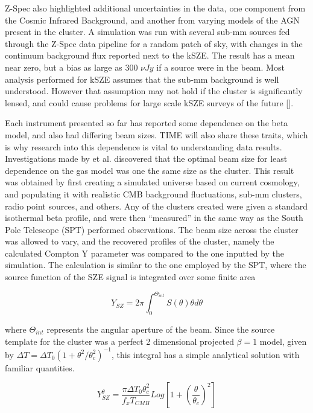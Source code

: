 \documentclass[manuscript]{aastex}
\begin{document}
Z-Spec also highlighted additional uncertainties in the data, one component from the Cosmic Infrared Background, and another from varying models of the AGN present in the cluster. A simulation was run with several sub-mm sources fed through the Z-Spec data pipeline for a random patch of sky, with changes in the continuum background flux reported next to the kSZE. The result has a mean near zero, but a bias as large as 300 $\nu Jy$ if a source were in the beam. Most analysis performed for kSZE assumes that the sub-mm background is well understood. However that assumption may not hold if the cluster is significantly lensed, and could cause problems for large scale kSZE surveys of the future [\cite{Zemcov2012}].

Each instrument presented so far has reported some dependence on the beta model, and also had differing beam sizes. TIME will also share these traits, which is why research into this dependence is vital to understanding data results. Investigations made by \cite{Saliwanchick2015} et al. discovered that the optimal beam size for least dependence on the gas model was one the same size as the cluster. This result was obtained by first creating a simulated universe based on current cosmology, and populating it with realistic CMB background fluctuations, sub-mm clusters, radio point sources, and others. Any of the clusters created were given a standard isothermal beta profile, and were then ``measured'' in the same way as the South Pole Telescope (SPT) performed observations. The beam size across the cluster was allowed to vary, and the recovered profiles of the cluster, namely the calculated Compton Y parameter was compared to the one inputted by the simulation. The calculation is similar to the one employed by the SPT, where the source function of the SZE signal is integrated over some finite area

\begin{equation}
Y_{SZ} = 2\pi \int_{0}^{\Theta_{int}} S(\theta) \theta d\theta
\end{equation}

where $\Theta_{int}$ represents the angular aperture of the beam. Since the source template for the cluster was a perfect 2 dimensional projected $\beta = 1$ model, given by $\Delta T = \Delta T_{0}(1 + \theta^{2}/\theta_{c}^{2})^{-1}$, this integral has a simple analytical solution with familiar quantities. 

\begin{equation}
Y_{SZ}^{\theta} = \frac{\pi \Delta T_{0} \theta_{c}^{2}}{f_{x} T_{CMB}} Log[1 + (\frac{\theta}{\theta_{c}})^{2}]
\end{equation}
\end{document}
